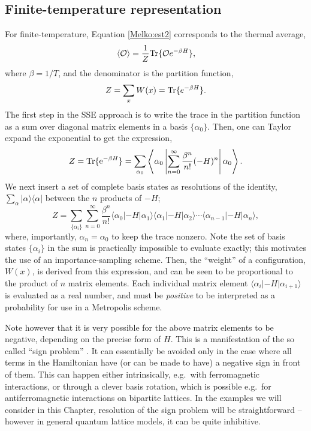 \documentclass[vecphys]{svmult}
\begin{document}
\subsection{Finite-temperature representation} \label{Melko:finiteT}

For finite-temperature, Equation \ref{Melko:est2} corresponds to the thermal average,
\begin{equation}
\langle \mathcal{O} \rangle  = \frac{1}{Z} {\rm Tr} \{ \mathcal{O} e^{- \beta H} \}, 
\end{equation}
where $\beta = 1/T$, and the denominator is the partition function,
\begin{equation}
Z = \sum_x W(x) = {\rm Tr} \{ e^{- \beta H} \}. 
\end{equation}
The first step in the SSE approach is to write the trace in the partition function as a sum over diagonal matrix elements in a basis $\{ \alpha_0 \}$.  Then, one can Taylor expand the exponential to get the expression,
\begin{equation}
Z={\rm Tr} \{ {\rm e}^{-\beta H} \}=\sum_{\alpha_0} \left\langle{ \alpha_0 \left|{ \sum_{n=0}^{\infty} \frac{ \beta^n}{n !} (-H)^n} \right| \alpha_0   }\right\rangle.
\end{equation}
We next insert a set of complete basis states as resolutions of the identity, $\sum_{\alpha} |\alpha \rangle  \langle \alpha |$ between the $n$ products of $-H$;
\begin{equation}
 Z=\sum_{\{ \alpha_i \}} \sum_{n=0}^{\infty} \frac{\beta^n}{n !} 
\langle \alpha_{0} | -H | \alpha_{1} \rangle \langle \alpha_1 | -H | \alpha_2\rangle  \cdots \langle \alpha_{n-1} | -H| \alpha_{n} \rangle,
\end{equation}
where, importantly,  $\alpha_{n}=\alpha_0$ to keep the trace nonzero.  
Note the set of basis states $\{ \alpha_i \}$ in the sum is practically impossible to evaluate exactly; this motivates the use of an importance-sampling scheme.  Then,
the ``weight'' of a configuration, $W(x)$, is derived from this expression, and can be seen to be proportional to the product of $n$ matrix elements.  Each individual matrix element $\langle{\alpha_{i} \left| {-H} \right| \alpha_{i+1}   }\rangle$ is evaluated as a real number, and must be {\em positive} to be interpreted as a probability  for use in a Metropolis scheme.  

Note however that it is very possible for the above matrix elements to be negative, depending on the precise form of $H$.
This is a manifestation of the so called ``sign problem'' \cite{Melko:Henelius00}.  It can 
essentially be avoided only in the case where all terms in the Hamiltonian have (or can be made to have) a negative sign in front of them. 
This can happen either intrinsically, e.g.~with ferromagnetic interactions, or through a clever basis rotation, which is possible e.g.~for antiferromagnetic interactions on bipartite lattices.  In the examples we will consider in this Chapter, resolution of the sign problem will be straightforward -- however in general quantum lattice models, it can be quite inhibitive.
\end{document}
